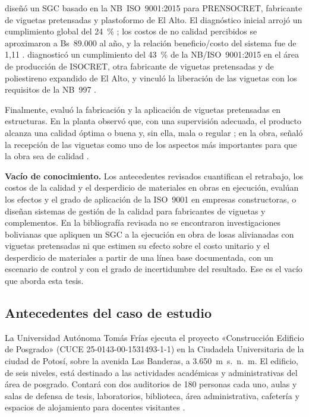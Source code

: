 \textcite{mamanicalsina2025} diseñó un SGC basado en la NB~ISO~9001:2015 para PRENSOCRET, fabricante de viguetas pretensadas y plastoformo de El Alto. El diagnóstico inicial arrojó un cumplimiento global del 24~\% \parencite[pp.~47--49]{mamanicalsina2025}; los costos de no calidad percibidos se aproximaron a Bs~89.000 al año, y la relación beneficio/costo del sistema fue de 1,11 \parencite[pp.~98--99, 117]{mamanicalsina2025}. \textcite{pena2024} diagnosticó un cumplimiento del 43~\% de la NB/ISO~9001:2015 en el área de producción de ISOCRET, otra fabricante de viguetas pretensadas y de poliestireno expandido de El Alto, y vinculó la liberación de las viguetas con los requisitos de la NB~997 \parencite[pp.~71, 74]{pena2024}.

Finalmente, \textcite{alcon2009} evaluó la fabricación y la aplicación de viguetas pretensadas en estructuras. En la planta observó que, con una supervisión adecuada, el producto alcanza una calidad óptima o buena y, sin ella, mala o regular \parencite[p.~150]{alcon2009}; en la obra, señaló la recepción de las viguetas como uno de los aspectos más importantes para que la obra sea de calidad \parencite[p.~115]{alcon2009}.


\textbf{Vacío de conocimiento.} Los antecedentes revisados cuantifican el retrabajo, los costos de la calidad y el desperdicio de materiales en obras en ejecución, evalúan los efectos y el grado de aplicación de la ISO~9001 en empresas constructoras, o diseñan sistemas de gestión de la calidad para fabricantes de viguetas y complementos. En la bibliografía revisada no se encontraron investigaciones bolivianas que apliquen un SGC a la ejecución en obra de losas alivianadas con viguetas pretensadas ni que estimen su efecto sobre el costo unitario y el desperdicio de materiales a partir de una línea base documentada, con un escenario de control y con el grado de incertidumbre del resultado. Ese es el vacío que aborda esta tesis.

\subsection{Antecedentes del caso de estudio}

La Universidad Autónoma Tomás Frías ejecuta el proyecto «Construcción Edificio de Posgrado» (CUCE 25-0143-00-1531493-1-1) en la Ciudadela Universitaria de la ciudad de Potosí, sobre la avenida Las Banderas, a 3.650~m~s.~n.~m. El edificio, de seis niveles, está destinado a las actividades académicas y administrativas del área de posgrado. Contará con dos auditorios de 180 personas cada uno, aulas y salas de defensa de tesis, laboratorios, biblioteca, área administrativa, cafetería y espacios de alojamiento para docentes visitantes \parencite[p.~1]{uatf_item13}.

